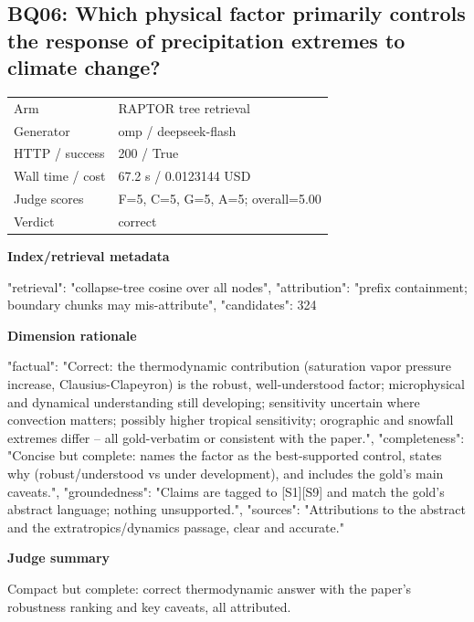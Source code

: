 \documentclass[10pt]{article}
\begin{document}
\subsection{BQ06: Which physical factor primarily controls the response of precipitation extremes to climate change?}
\begin{tabular}{@{}ll@{}}
Arm & RAPTOR tree retrieval\\
Generator & omp / deepseek-flash\\
HTTP / success & 200 / True\\
Wall time / cost & 67.2 s / 0.0123144 USD\\
Judge scores & F=5, C=5, G=5, A=5; overall=5.00\\
Verdict & correct\\
\end{tabular}

\textbf{Index/retrieval metadata}
\begin{EvidenceText}
{
  "retrieval": "collapse-tree cosine over all nodes",
  "attribution": "prefix containment; boundary chunks may mis-attribute",
  "candidates": 324
}
\end{EvidenceText}

\textbf{Dimension rationale}
\begin{EvidenceText}
{
  "factual": "Correct: the thermodynamic contribution (saturation vapor pressure increase, Clausius-Clapeyron) is the robust, well-understood factor; microphysical and dynamical understanding still developing; sensitivity uncertain where convection matters; possibly higher tropical sensitivity; orographic and snowfall extremes differ -- all gold-verbatim or consistent with the paper.",
  "completeness": "Concise but complete: names the factor as the best-supported control, states why (robust/understood vs under development), and includes the gold's main caveats.",
  "groundedness": "Claims are tagged to [S1][S9] and match the gold's abstract language; nothing unsupported.",
  "sources": "Attributions to the abstract and the extratropics/dynamics passage, clear and accurate."
}
\end{EvidenceText}

\textbf{Judge summary}
\begin{EvidenceText}
Compact but complete: correct thermodynamic answer with the paper's robustness ranking and key caveats, all attributed.
\end{EvidenceText}
\end{document}
